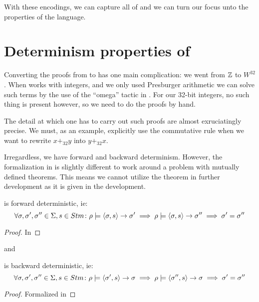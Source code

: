 With these encodings, we can capture all of \januso{} and we can turn
our focus unto the properties of the language.

\section{Determinism properties of \januso{}}

Converting the proofs from \janusz{} to \januso{} has one main
complication: we went from $\mathbb{Z}$ to $W^{32}$. When \coq{} works with
integers, and we only used Presburger
arithmetic\cite{cooper+1972:theorem-prooving} we can solve such terms
by the use of the ``omega'' tactic in \coq{}. For our 32-bit integers,
no such thing is present however, so we need to do the proofs by hand.

The detail at which one has to carry out such proofs are almost
exruciatingly precise. We must, as an example, explicitly use the
commutative rule when we want to rewrite $x +_{32} y$ into $y +_{32}
x$.

Irregardless, we have forward and backward determinism. However, the
formalization in \coq{} is slightly different to work around a problem
with mutually defined theorems. This means we cannot utilize the
theorem in further development as it is given in the development.
\begin{thm}
\label{thm:j1-fwd-det}
  \januso{} is forward deterministic, ie:
  \begin{equation*}
    \forall \sigma, \sigma', \sigma'' \in \Sigma, s \in Stm \colon
    \rho |= \langle \sigma, s \rangle -> \sigma' \implies \rho |= \langle \sigma, s \rangle -> \sigma'' \implies \sigma' = \sigma''
  \end{equation*}
\end{thm}
\begin{proof}
  In \coq{}
\end{proof}
and
\begin{thm}
\label{thm:j1-bwd-det}
  \januso{} is backward deterministic, ie:
  \begin{equation*}
    \forall \sigma, \sigma', \sigma'' \in \Sigma, s \in Stm \colon
    \rho |= \langle \sigma', s \rangle -> \sigma \implies \rho |= \langle \sigma'', s \rangle -> \sigma \implies \sigma' = \sigma''
  \end{equation*}
\end{thm}
\begin{proof}
  Formalized in \coq{}
\end{proof}


